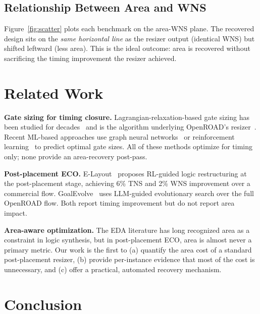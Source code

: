 \documentclass[journal]{IEEEtran}
\begin{document}
\subsection{Relationship Between Area and WNS}

Figure~\ref{fig:scatter} plots each benchmark on the area-WNS plane. The
recovered design sits on the \emph{same horizontal line} as the resizer
output (identical WNS) but shifted leftward (less area). This is the
ideal outcome: area is recovered without sacrificing the timing
improvement the resizer achieved.

\section{Related Work}

\textbf{Gate sizing for timing closure.} Lagrangian-relaxation-based gate
sizing has been studied for decades~\cite{chen1999lr} and is the
algorithm underlying OpenROAD's resizer~\cite{openroad2020}. Recent
ML-based approaches use graph neural networks~\cite{jiang2024ir,
graphsym2023} or reinforcement learning~\cite{elayout2026} to predict
optimal gate sizes. All of these methods optimize for timing only; none
provide an area-recovery post-pass.

\textbf{Post-placement ECO.} E-Layout~\cite{elayout2026} proposes RL-guided
logic restructuring at the post-placement stage, achieving 6\% TNS and
2\% WNS improvement over a commercial flow. GoalEvolve~\cite{goalEvolve2026}
uses LLM-guided evolutionary search over the full OpenROAD flow. Both
report timing improvement but do not report area impact.

\textbf{Area-aware optimization.} The EDA literature has long recognized
area as a constraint in logic synthesis, but in post-placement ECO, area
is almost never a primary metric. Our work is the first to (a) quantify
the area cost of a standard post-placement resizer, (b) provide
per-instance evidence that most of the cost is unnecessary, and (c) offer
a practical, automated recovery mechanism.

\section{Conclusion}
\end{document}
